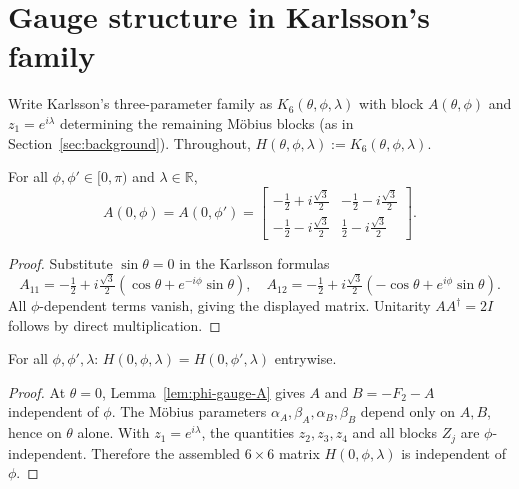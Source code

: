
\section{Gauge structure in Karlsson's family}
\label{sec:proof-gauge}

Write Karlsson's three-parameter family as $K_6(\theta,\phi,\lambda)$ with block $A(\theta,\phi)$ and $z_1=e^{i\lambda}$ determining the remaining M\"obius blocks (as in Section~\ref{sec:background}).
Throughout, $H(\theta,\phi,\lambda):=K_6(\theta,\phi,\lambda)$.

\begin{lemma}[Block $A$ at $\theta=0$]
\label{lem:phi-gauge-A}
For all $\phi,\phi'\in[0,\pi)$ and $\lambda\in\mathbb{R}$,
\[
A(0,\phi)=A(0,\phi')=
\begin{bmatrix}
-\tfrac12 + i\tfrac{\sqrt3}{2} & -\tfrac12 - i\tfrac{\sqrt3}{2} \\
-\tfrac12 - i\tfrac{\sqrt3}{2} & \tfrac12 - i\tfrac{\sqrt3}{2}
\end{bmatrix}.
\]
\end{lemma}

\begin{proof}
Substitute $\sin\theta=0$ in the Karlsson formulas
\[
A_{11}=-\tfrac12 + i\tfrac{\sqrt3}{2}(\cos\theta+e^{-i\phi}\sin\theta),\quad
A_{12}=-\tfrac12 + i\tfrac{\sqrt3}{2}(-\cos\theta+e^{i\phi}\sin\theta).
\]
All $\phi$-dependent terms vanish, giving the displayed matrix.
Unitarity $AA^\dagger=2I$ follows by direct multiplication.
\end{proof}

\begin{lemma}[$\phi$-gauge for $H$ at $\theta=0$]
\label{lem:L1}
For all $\phi,\phi',\lambda$: $H(0,\phi,\lambda)=H(0,\phi',\lambda)$ entrywise.
\end{lemma}

\begin{proof}
At $\theta=0$, Lemma~\ref{lem:phi-gauge-A} gives $A$ and $B=-F_2-A$ independent of $\phi$.
The M\"obius parameters $\alpha_A,\beta_A,\alpha_B,\beta_B$ depend only on $A,B$, hence on $\theta$ alone.
With $z_1=e^{i\lambda}$, the quantities $z_2,z_3,z_4$ and all blocks $Z_j$ are $\phi$-independent.
Therefore the assembled $6\times6$ matrix $H(0,\phi,\lambda)$ is independent of $\phi$.
\end{proof}

